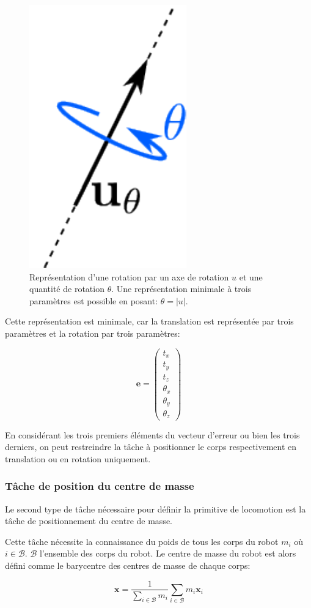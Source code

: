 \begin{figure}
  \begin{center}
    \includegraphics[width=.1\linewidth]{src/chap3-primitive-mouvement/utheta.pdf}
  \end{center}
  \caption{Représentation d'une rotation par un axe de rotation $u$ et
    une quantité de rotation $\theta$. Une représentation minimale à
    trois paramètres est possible en posant: $\theta = |u|$. \label{fig:utheta}}
\end{figure}


Cette représentation est minimale, car la translation est représentée
par trois paramètres et la rotation par trois paramètres:

\begin{equation}
  \mathbf{e} = \left(
  \begin{array}{c}
    t_x\\
    t_y\\
    t_z\\
    \theta_x\\
    \theta_y\\
    \theta_z
  \end{array}
  \right)
\end{equation}

En considérant les trois premiers éléments du vecteur d'erreur ou bien
les trois derniers, on peut restreindre la tâche à positionner le corps
respectivement en translation ou en rotation uniquement.


\subsubsection{Tâche de position du centre de masse}


Le second type de tâche nécessaire pour définir la primitive de
locomotion est la tâche de positionnement du centre de masse.

Cette tâche nécessite la connaissance du poids de tous les corps du
robot $m_i$ où $i \in \mathcal{B}$. $\mathcal{B}$ l'ensemble des corps
du robot. Le centre de masse du robot est alors défini comme le
barycentre des centres de masse de chaque corps:

\begin{equation}
  \mathbf{x} = \frac{1}{\sum_{i \in \mathcal{B}} m_i} \sum_{i \in \mathcal{B}} m_i \mathbf{x}_i
\end{equation}

